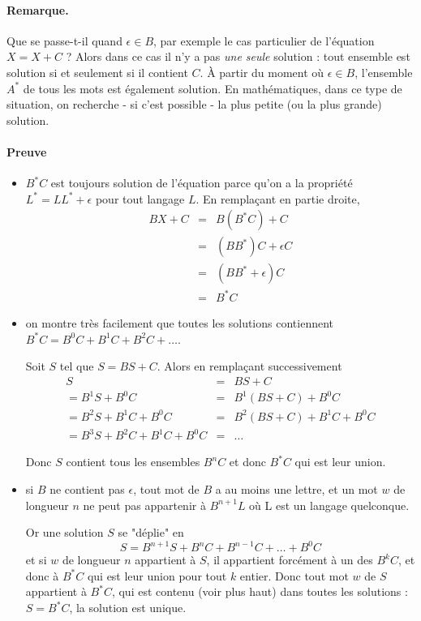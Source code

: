 \documentclass[10pt,twoside]{article}
\begin{document}
\paragraph{Remarque. } Que se passe-t-il quand $\epsilon \in B$, par exemple
le cas particulier de l'équation $X = X + C$ ? 
Alors dans ce cas il n'y a pas
\emph{une seule} solution : tout ensemble est solution si et seulement
si il contient $C$. À partir du moment où $\epsilon \in B$, 
l'ensemble $A^*$ de tous les mots est également solution. En mathématiques,
dans ce type de situation, on recherche - si c'est possible -  la plus
petite (ou la plus grande) solution.

\paragraph{Preuve}
\begin{itemize}
\item $B^* C$ est toujours solution de l'équation parce qu'on a
la propriété $L^* = LL^* + \epsilon$ pour tout langage $L$.
En
 remplaçant en partie droite, 
 \begin{eqnarray*}
 BX+C &=& B(B^* C) + C \\ 
      &=& (B B^*)C + \epsilon C \\
      &=& (B B^* + \epsilon) C \\
      &=&  B^* C
      \end{eqnarray*}
\item on montre très facilement que 
toutes les solutions contiennent 
$ B^* C = B^0 C + B^1C + B^2 C + \ldots$.

Soit $S$ tel que $S = BS+C$. Alors en remplaçant successivement
$$\begin{array}{rccccl}
 S &=& B S + C \\
 = B^1 S + B^0 C &=& B^1 (B S + C) + B^0 C \\
    =  B^2 S + B^1 C + B^0 C &=&  B^2 (BS+C) + B^1 C + B^0 C \\
    = B^3 S + B^2 C+ B^1 C + B^0 C &=& \ldots
\end{array}
$$

Donc $S$ contient tous les ensembles $B^nC$ et donc $B^*C$ qui est
leur union. 
\item si $B$ ne contient pas $\epsilon$, tout mot de $B$ a au moins 
une lettre, et un mot $w$ de longueur $n$ ne peut pas appartenir
à $B^{n+1} L$ où L est un langage quelconque.

Or une solution $S$ se "déplie" en
$$ S = B^{n+1}S + B^nC + B^{n-1}C + \ldots + B^0 C$$
et si $w$ de longueur $n$ appartient à $S$, il appartient
forcément à un des $B^k C$, et donc à $B^*C$ qui est leur union
pour tout $k$ entier. Donc tout mot $w$ de $S$ appartient à $B^*C$, qui est
contenu (voir plus haut) dans toutes les solutions : $S = B^*C$, 
la solution est unique.

\end{itemize}
\end{document}
